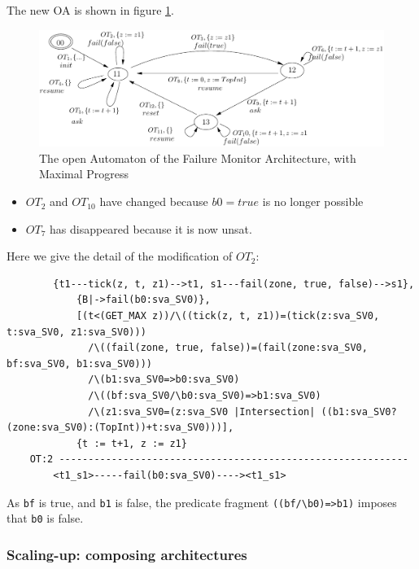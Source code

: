 \documentclass{llncs}
\begin{document}
  The new OA is shown in figure \ref{schema:ArchFailure:OA-MaxProgress}.

  \begin{figure}[t]
  \centering
  \includegraphics[width=\columnwidth]{TimerOAMaxProgress}
  \caption{The open Automaton of the Failure Monitor Architecture,
    with Maximal Progress}
  \label{schema:ArchFailure:OA-MaxProgress}
\end{figure}

\begin{itemize}
\item $OT_2$ and $OT_{10}$ have changed because $b0=true$ is no longer possible
\item $OT_7$ has disappeared because it is now unsat.
\end{itemize}

  Here we give the detail of the modification of $OT_2$:

\small\begin{verbatim}
	    {t1---tick(z, t, z1)-->t1, s1---fail(zone, true, false)-->s1},
            {B|->fail(b0:sva_SV0)},
            [(t<(GET_MAX z))/\((tick(z, t, z1))=(tick(z:sva_SV0, t:sva_SV0, z1:sva_SV0)))
              /\((fail(zone, true, false))=(fail(zone:sva_SV0, bf:sva_SV0, b1:sva_SV0)))
              /\(b1:sva_SV0=>b0:sva_SV0)
              /\((bf:sva_SV0/\b0:sva_SV0)=>b1:sva_SV0)
              /\(z1:sva_SV0=(z:sva_SV0 |Intersection| ((b1:sva_SV0?(zone:sva_SV0):(TopInt))+t:sva_SV0)))],
            {t := t+1, z := z1}
	OT:2 ------------------------------------------------------------
		<t1_s1>-----fail(b0:sva_SV0)----><t1_s1>
\end{verbatim}

As \verb|bf| is true, and \verb|b1| is false, the predicate fragment
\verb|((bf/\b0)=>b1)| imposes that \verb|b0| is false.

\subsubsection{Scaling-up: composing architectures}
\end{document}
